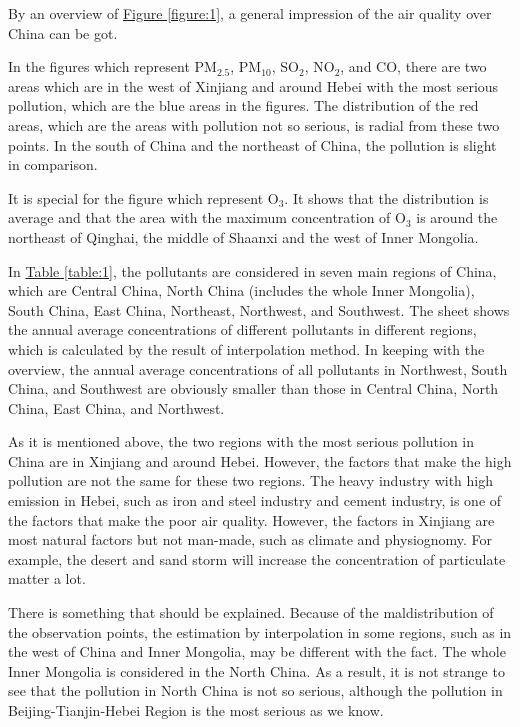 \documentclass[letterpaper]{article}
\begin{document}
\begin{CJK*}{UTF8}{gkai}
By an overview of \hyperref[figure:1]{Figure \ref*{figure:1}}, a general impression of the air quality over China can be got.

In the figures which represent PM$_{2.5}$, PM$_{10}$, SO$_{2}$, NO$_{2}$, and CO, there are two areas which are in the west of Xinjiang and around Hebei with the most serious pollution, which are the blue areas in the figures. The distribution of the red areas, which are the areas with pollution not so serious, is radial from these two points. In the south of China and the northeast of China, the pollution is slight in comparison.

It is special for the figure which represent O$_{3}$. It shows that the distribution is average and that the area with the maximum concentration of O$_{3}$ is around the northeast of Qinghai, the middle of Shaanxi and the west of Inner Mongolia.


In \hyperref[table:1]{Table \ref*{table:1}}, the pollutants are considered in seven main regions of China, which are Central China, North China (includes the whole Inner Mongolia), South China, East China, Northeast, Northwest, and Southwest. The sheet shows the annual average concentrations of different pollutants in different regions, which is calculated by the result of interpolation method. In keeping with the overview, the annual average concentrations of all pollutants in Northwest, South China, and Southwest are obviously smaller than those in Central China, North China, East China, and Northwest.

As it is mentioned above, the two regions with the most serious pollution in China are in Xinjiang and around Hebei. However, the factors that make the high pollution are not the same for these two regions. The heavy industry with high emission in Hebei, such as iron and steel industry and cement industry, is one of the factors that make the poor air quality. However, the factors in Xinjiang are most natural factors but not man-made, such as climate and physiognomy. For example, the desert and sand storm will increase the concentration of particulate matter a lot.

There is something that should be explained. Because of the maldistribution of the observation points, the estimation by interpolation in some regions, such as in the west of China and Inner Mongolia, may be different with the fact. The whole Inner Mongolia is considered in the North China. As a result, it is not strange to see that the pollution in North China is not so serious, although the pollution in Beijing-Tianjin-Hebei Region is the most serious as we know.


\end{CJK*}
\end{document}
